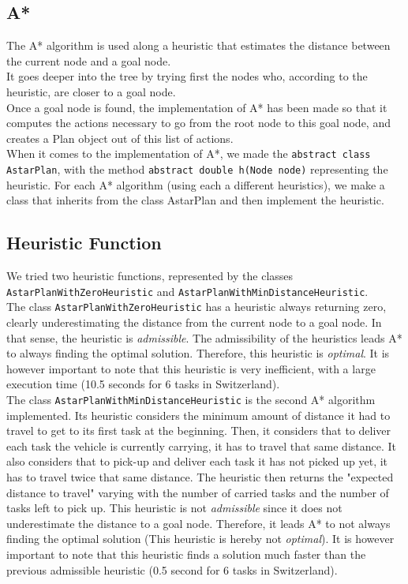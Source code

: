 \documentclass[11pt]{article}
\begin{document}
\subsection{A*}
The A* algorithm is used along a heuristic that estimates the distance between the current node and a goal node.\\

It goes deeper into the tree by trying first the nodes who, according to the heuristic, are closer to a goal node.\\

Once a goal node is found, the implementation of A* has been made so that it computes the actions necessary to go from the root node to this goal node, and creates a Plan object out of this list of actions.\\

When it comes to the implementation of A*, we made the \texttt{abstract class AstarPlan}, with the method \texttt{abstract double h(Node node)} representing the heuristic. For each A* algorithm (using each a different heuristics), we make a class that inherits from\textsl{} the class AstarPlan and then implement the heuristic. 

\subsection{Heuristic Function}
We tried two heuristic functions, represented by the classes \texttt{AstarPlanWithZeroHeuristic} and \texttt{AstarPlanWithMinDistanceHeuristic}.\\

The class \texttt{AstarPlanWithZeroHeuristic} has a heuristic always returning zero, clearly underestimating the distance from the current node to a goal node. In that sense, the heuristic is \textit{admissible}. The admissibility of the heuristics leads A* to always finding the optimal solution. Therefore, this heuristic is \textit{optimal}. It is however important to note that this heuristic is very inefficient, with a large execution time (10.5 seconds for 6 tasks in Switzerland).\\

The class \texttt{AstarPlanWithMinDistanceHeuristic} is the second A* algorithm implemented. Its heuristic considers the minimum amount of distance it had to travel to get to its first task at the beginning. Then, it considers that to deliver each task the vehicle is currently carrying, it has to travel that same distance. It also considers that to pick-up and deliver each task it has not picked up yet, it has to travel twice that same distance. The heuristic then returns the "expected distance to travel" varying with the number of carried tasks and the number of tasks left to pick up. This heuristic is not \textit{admissible} since it does not underestimate the distance to a goal node. Therefore, it leads A* to not always finding the optimal solution (This heuristic is hereby not \textit{optimal}). It is however important to note that this heuristic finds a solution much faster than the previous admissible heuristic (0.5 second for 6 tasks in Switzerland).
\end{document}
